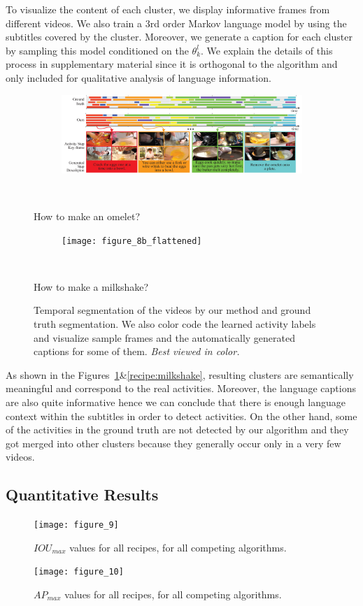 To visualize the content of each cluster, we display informative frames from different videos. We also train a 3rd order Markov language model\cite{languageModel} by using the subtitles covered by the cluster. Moreover, we generate a caption for each cluster by sampling this model conditioned on the $\theta^l_k$. We explain the details of this process in supplementary material since it is orthogonal to the algorithm and only included for qualitative analysis of language information.

\begin{figure}[ht]
  \begin{subfigure}[b]{\textwidth}
    \includegraphics[width=\textwidth]{figure_8a_flattened}
  \end{subfigure}~
\caption{How to make an omelet?}
      \label{recipe:ommelette}
       \begin{subfigure}[b]{\textwidth}
    \texttt{[image: figure\_8b\_flattened]}
  \end{subfigure}~
 \caption{How to make a milkshake?}
    \label{recipe:milkshake}
\caption{Temporal segmentation of the videos by our method and ground truth segmentation. We also color code the learned activity labels and visualize sample frames and the automatically generated captions for some of them. \emph{Best viewed in color.}}
\label{recipe:ommelette}
\fi
\end{figure}

As shown in the Figures~\ref{recipe:ommelette}\&\ref{recipe:milkshake}, resulting clusters are semantically meaningful and correspond to the real activities. Moreover, the language captions are also quite informative hence we can conclude that there is enough language context within the subtitles in order to detect activities. On the other hand, some of the activities in the ground truth are not detected by our algorithm and they got merged into other clusters because they generally occur only in a very few videos.
\subsection{Quantitative Results}
\begin{figure}[t]
  \texttt{[image: figure\_9]}
  \caption{$IOU_{max}$ values for all recipes, for all competing algorithms.}
  \label{mIOU}
\texttt{[image: figure\_10]}
\caption{$AP_{max}$ values for all recipes, for all competing algorithms.}
\label{mmAP}
\end{figure}

